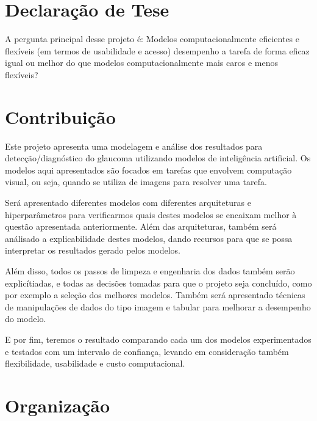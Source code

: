 \documentclass[ %
	msc, %
	portugues %
]{../ppgccufmg}
\begin{document}
    \section{Declaração de Tese}

    A pergunta principal desse projeto é: Modelos computacionalmente eficientes e flexíveis (em
    termos de usabilidade e acesso) desempenho a tarefa
    de forma eficaz igual ou melhor do que modelos computacionalmente mais caros e menos flexíveis?

    \section{Contribuição}

    Este projeto apresenta uma modelagem e análise dos resultados para detecção/diagnóstico do
    glaucoma utilizando modelos de inteligência artificial. Os modelos aqui apresentados são focados
    em tarefas que envolvem computação visual, ou seja, quando se utiliza de imagens para
    resolver uma tarefa.

    Será apresentado diferentes modelos com diferentes arquiteturas e hiperparâmetros para
    verificarmos quais destes modelos se encaixam melhor à questão apresentada anteriormente. Além
    das arquiteturas, também será análisado a explicabilidade destes modelos, dando recursos para
    que se possa interpretar os resultados gerado pelos modelos.

    Além disso, todos os passos de limpeza e engenharia dos dados também serão explicítiadas, e
    todas as decisões tomadas para que o projeto seja concluído, como por exemplo a seleção dos
    melhores modelos. Também será apresentado técnicas de manipulações de dados do tipo
    imagem e tabular para melhorar a desempenho do modelo.

    E por fim, teremos o resultado comparando cada um dos modelos experimentados e testados com um
    intervalo de confiança, levando em consideração também flexibilidade, usabilidade e custo
    computacional.

    \section{Organização}
\end{document}
